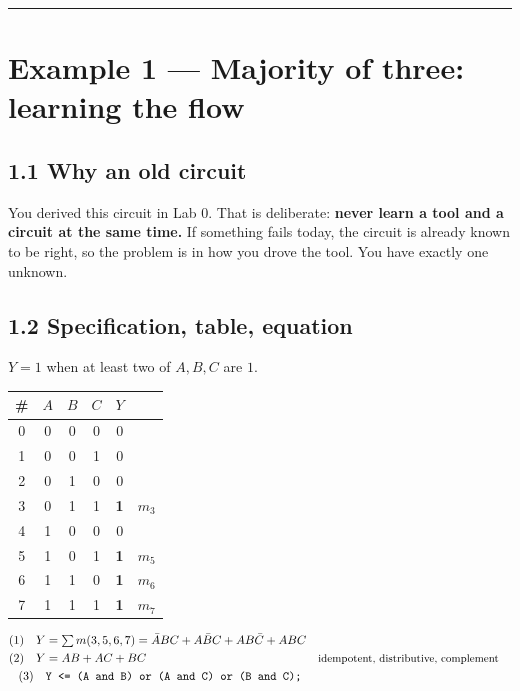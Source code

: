 \documentclass[11pt]{article}
\newcommand{\code}[1]{\texttt{#1}}
\newcommand{\hr}{\vspace{2pt}\hrule\vspace{6pt}}
\begin{document}
\vspace{4pt}\hr

\section*{Example 1 --- Majority of three: learning the flow}

\subsection*{1.1 Why an old circuit}

You derived this circuit in Lab 0. That is deliberate: \textbf{never learn a tool and
a circuit at the same time.} If something fails today, the circuit is already known
to be right, so the problem is in how you drove the tool. You have exactly one unknown.

\subsection*{1.2 Specification, table, equation}

$Y = 1$ when at least two of $A,B,C$ are $1$.

\begin{center}
\begin{tabular}{c|ccc|c|l}
\toprule
\# & $A$ & $B$ & $C$ & $Y$ & \\
\midrule
0 & 0&0&0 & 0 & \\
1 & 0&0&1 & 0 & \\
2 & 0&1&0 & 0 & \\
3 & 0&1&1 & \textbf{1} & $m_3$ \\
4 & 1&0&0 & 0 & \\
5 & 1&0&1 & \textbf{1} & $m_5$ \\
6 & 1&1&0 & \textbf{1} & $m_6$ \\
7 & 1&1&1 & \textbf{1} & $m_7$ \\
\bottomrule
\end{tabular}
\end{center}

\begin{align*}
\text{(1)}\quad Y &= \textstyle\sum m(3,5,6,7) = \bar{A}BC + A\bar{B}C + AB\bar{C} + ABC \\
\text{(2)}\quad Y &= AB + AC + BC
  && \text{\small idempotent, distributive, complement} \\
\text{(3)}\quad & \code{Y <= (A and B) or (A and C) or (B and C);}
\end{align*}
\end{document}
